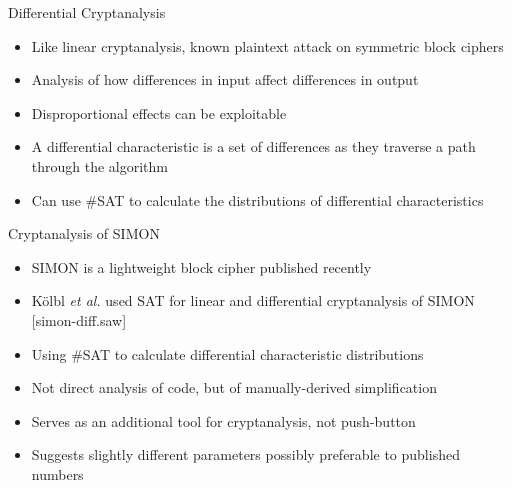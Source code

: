 \documentclass[ignorenonframetext,]{beamer}
\providecommand{\tightlist}{%
  \setlength{\itemsep}{0pt}\setlength{\parskip}{0pt}}
\newcommand{\infile}[1]{{\tiny \alert{[#1]}}}
\begin{document}
\begin{frame}{Differential Cryptanalysis}

\begin{itemize}
\tightlist
\item
  Like linear cryptanalysis, known plaintext attack on symmetric block
  ciphers
\item
  Analysis of how differences in input affect differences in output
\item
  Disproportional effects can be exploitable
\item
  A \alert{differential characteristic} is a set of differences as they
  traverse a path through the algorithm
\item
  Can use \#SAT to calculate the distributions of differential
  characteristics
\end{itemize}

\end{frame}

\begin{frame}{Cryptanalysis of SIMON}

\begin{itemize}
\tightlist
\item
  SIMON is a lightweight block cipher published recently
\item
  Kölbl \emph{et al.} used SAT for linear and differential cryptanalysis of
  SIMON \cite{kolbl2015simon} \infile{simon-diff.saw}
\item
  Using \#SAT to calculate differential characteristic distributions
\item
  Not direct analysis of code, but of manually-derived simplification
\item
  Serves as an additional tool for cryptanalysis, not push-button
\item
  Suggests slightly different parameters possibly preferable to
  published numbers
\end{itemize}

\end{frame}
\end{document}
